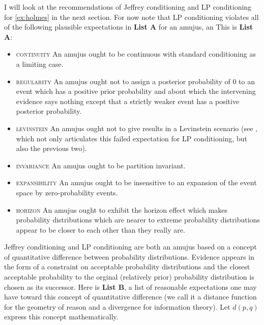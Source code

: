 \documentclass[smallextended]{svjour3}       %
\begin{document}
I will look at the recommendations of Jeffrey conditioning and LP
conditioning for {\xample} \ref{ex:holmes} in the next section. For
now note that LP conditioning violates all of the following plausible
expectations in \textbf{List A}\label{page:listone} for an amujus, an
 This is \textbf{List A}:

\begin{itemize}
\item \textsc{continuity} An amujus ought to be continuous with
  standard conditioning as a limiting case.
\item \textsc{regularity} An amujus ought not to assign a posterior
  probability of $0$ to an event which has a positive prior
  probability and about which the intervening evidence says nothing
  except that a strictly weaker event has a positive posterior
  probability.
\item \textsc{levinstein} An amujus ought not to give  results in a Levinstein scenario (see
  , which not only articulates this failed
  expectation for LP conditioning, but also the previous two).
\item \textsc{invariance} An amujus ought to be partition invariant.
\item \textsc{expansibility} An amujus ought to be insensitive to an
  expansion of the event space by zero-probability events.
\item \textsc{horizon} An amujus ought to exhibit the horizon effect
  which makes probability distributions which are nearer to extreme
  probability distributions appear to be closer to each other than
  they really are.
\end{itemize}

Jeffrey conditioning and LP conditioning are both an amujus based on a
concept of quantitative difference between probability distributions.
Evidence appears in the form of a constraint on acceptable probability
distributions and the closest acceptable probability to the orginal
(relatively prior) probability distribution is chosen as its
successor. Here is \textbf{List B}\label{page:listtwo}, a list of
reasonable expectations one may have toward this concept of
quantitative difference (we call it a distance function for the
geometry of reason and a divergence for information theory). Let
$d(p,q)$ express this concept mathematically.
\end{document}
